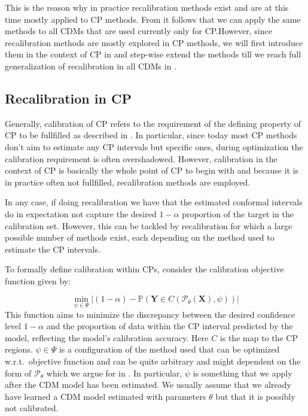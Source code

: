 This is the reason why in practice recalibration methods exist and are at this time mostly applied to CP methods. From  it follows that we can apply the same methods to all CDMs that are used currently only for CP.\@ However, since recalibration methods are mostly explored in CP methods, we will first introduce them in the context of CP in  and step-wise extend the methods till we reach full generalization of recalibration in all CDMs in .

\subsection{Recalibration in CP}\label{sec:recalibration_cp}
Generally, calibration of CP refers to the requirement of the defining property of CP to be fullfilled as described in . In particular, since today most CP methods don't aim to estimate any CP intervals but specific ones, during optimization the calibration requirement is often overshadowed. However, calibration in the context of CP is basically the whole point of CP to begin with and because it is in practice often not fullfilled, recalibration methods are employed.

In any case, if doing recalibration we have that the estimated conformal intervals do in expectation not capture the desired $1 - \alpha$ proportion of the target in the calibration set. However, this can be tackled by recalibration for which a large possible number of methods exist, each depending on the method used to estimate the CP intervals.

To formally define calibration within CPs, consider the calibration objective function given by:

\begin{equation}
    \min_{\psi \in \Psi} |(1 - \alpha) - \mathbb{P}(\mathbf{Y} \in C(\mathscr{P}_{\theta}(\mathbf{X}), \psi))|
    \label{eq:calibration_objective_formal}
\end{equation}
This function aims to minimize the discrepancy between the desired confidence level \(1 - \alpha\) and the proportion of data within the CP interval predicted by the model, reflecting the model's calibration accuracy. Here $C$ is the map to the CP regions. $\psi\in\Psi$ is a configuration of the method used that can be optimized w.r.t.\ objective function and can be quite arbitrary and might dependent on the form of $\mathscr{P}_{\theta}$ which we argue for in . In particular, $\psi$ is something that we apply after the CDM model has been estimated. We usually assume that we already have learned a CDM model estimated with parameters $\theta$ but that it is possibly not calibrated.

